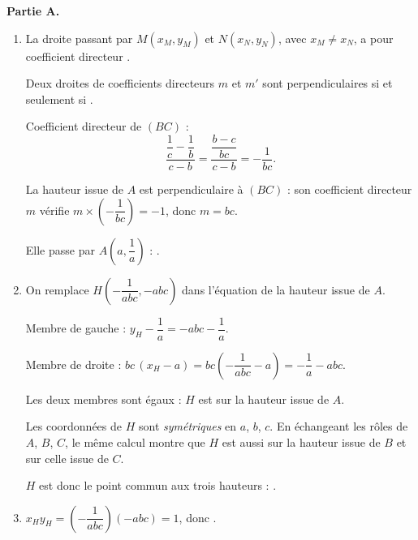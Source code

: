 \textbf{Partie A.}
\begin{enumerate}[itemsep=14pt]
  \item\leavevmode
  \begin{prop}
  La droite passant par $M(x_M,y_M)$ et $N(x_N,y_N)$, avec $x_M\neq x_N$, a pour coefficient directeur .

  Deux droites de coefficients directeurs $m$ et $m'$ sont perpendiculaires si et seulement si .
  \end{prop}
  Coefficient directeur de $(BC)$ :
  \[\dfrac{\dfrac1c-\dfrac1b}{c-b}=\dfrac{\dfrac{b-c}{bc}}{c-b}=-\dfrac{1}{bc}.\]

  La hauteur issue de $A$ est perpendiculaire à $(BC)$ : son coefficient directeur $m$ vérifie $m\times\left(-\dfrac1{bc}\right)=-1$, donc $m=bc$.

  Elle passe par $A\left(a,\dfrac1a\right)$ : .

  \item On remplace $H\left(-\dfrac1{abc},-abc\right)$ dans l'équation de la hauteur issue de $A$.

  Membre de gauche : $y_H-\dfrac1a=-abc-\dfrac1a$.

  Membre de droite : $bc\,(x_H-a)=bc\left(-\dfrac1{abc}-a\right)=-\dfrac1a-abc$.

  Les deux membres sont égaux : $H$ est sur la hauteur issue de $A$.

  Les coordonnées de $H$ sont \emph{symétriques} en $a$, $b$, $c$. En échangeant les rôles de $A$, $B$, $C$, le même calcul montre que $H$ est aussi sur la hauteur issue de $B$ et sur celle issue de $C$.

  $H$ est donc le point commun aux trois hauteurs : .

  \item $x_Hy_H=\left(-\dfrac{1}{abc}\right)(-abc)=1$, donc .
\end{enumerate}

